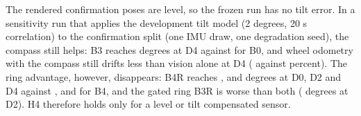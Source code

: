 The rendered confirmation poses are level, so the frozen run has no tilt error. In a sensitivity run that applies the development tilt model (2 degrees, 20 s correlation) to the confirmation split (one IMU draw, one degradation seed), the compass still helps: B3 reaches \stBthreeDfourhd{} degrees at D4 against \stBzeroDfourhd{} for B0, and wheel odometry with the compass still drifts less than vision alone at D4 (\stWthreeDfourdr{} against \stBzeroDfourdr{} percent). The ring advantage, however, disappears: B4R reaches \stBfourRDzerohd{}, \stBfourRDtwohd{} and \stBfourRDfourhd{} degrees at D0, D2 and D4 against \stBfourDzerohd{}, \stBfourDtwohd{} and \stBfourDfourhd{} for B4, and the gated ring B3R is worse than both (\stBthreeRDtwohd{} degrees at D2). H4 therefore holds only for a level or tilt compensated sensor.
